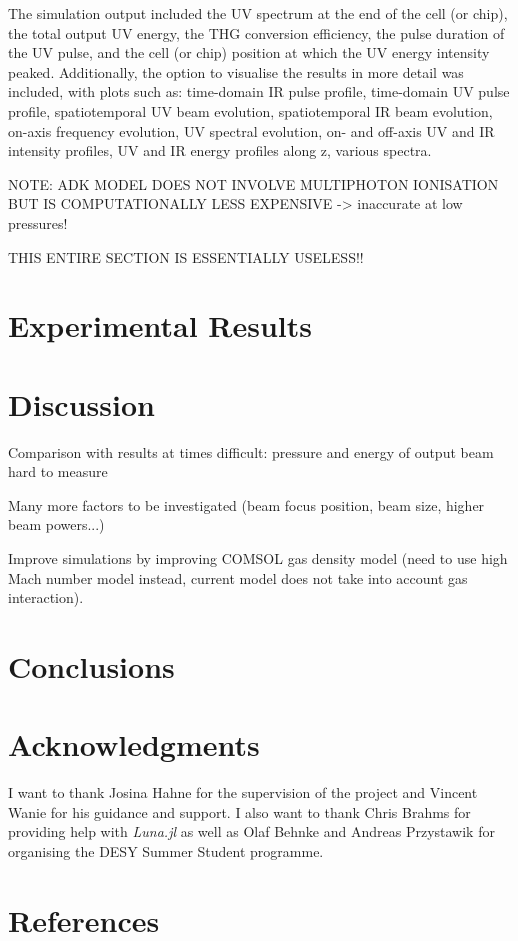 \documentclass[a4paper]{jpconf}
\begin{document}
The simulation output included the UV spectrum at the end of the cell (or chip), the total output UV energy, the THG conversion efficiency, the pulse duration of the UV pulse, and the cell (or chip) position at which the UV energy intensity peaked. Additionally, the option to visualise the results in more detail was included, with plots such as: time-domain IR pulse profile, time-domain UV pulse profile, spatiotemporal UV beam evolution, spatiotemporal IR beam evolution, on-axis frequency evolution, UV spectral evolution, on- and off-axis UV and IR intensity profiles, UV and IR energy profiles along z, various spectra. \par 


NOTE: ADK MODEL DOES NOT INVOLVE MULTIPHOTON IONISATION BUT IS COMPUTATIONALLY LESS EXPENSIVE
-> inaccurate at low pressures! 

THIS ENTIRE SECTION IS ESSENTIALLY USELESS!!

\section{Experimental Results}

\section{Discussion}
Comparison with results at times difficult: pressure and energy of output beam hard to measure


Many more factors to be investigated (beam focus position, beam size, higher beam powers...)


Improve simulations by improving COMSOL gas density model (need to use high Mach number model instead, current model does not take into account gas interaction). 

\section{Conclusions}

\section*{Acknowledgments}
I want to thank Josina Hahne for the supervision of the project and Vincent Wanie for his guidance and support. I also want to thank Chris Brahms for providing help with \textit{Luna.jl} as well as Olaf Behnke and Andreas Przystawik for organising the DESY Summer Student programme.  


\section*{References}


\end{document}
